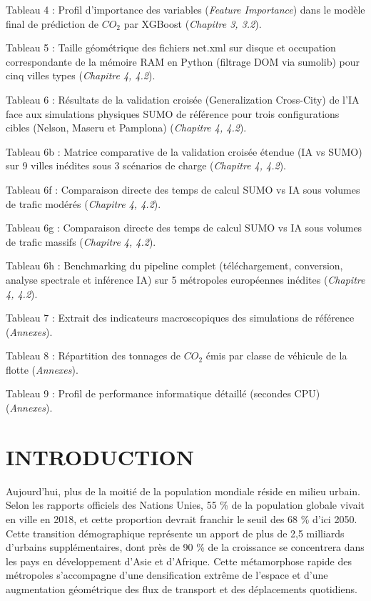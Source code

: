 \documentclass[10pt, a4paper]{article}
\begin{document}
Tableau 4 : Profil d'importance des variables (\emph{Feature
Importance}) dans le modèle final de prédiction de \(CO_2\) par XGBoost
(\emph{Chapitre 3, 3.2}).

Tableau 5 : Taille géométrique des fichiers net.xml sur disque et
occupation correspondante de la mémoire RAM en Python (filtrage DOM via
sumolib) pour cinq villes types (\emph{Chapitre 4, 4.2}).

Tableau 6 : Résultats de la validation croisée (Generalization
Cross-City) de l'IA face aux simulations physiques SUMO de référence
pour trois configurations cibles (Nelson, Maseru et Pamplona)
(\emph{Chapitre 4, 4.2}).

Tableau 6b : Matrice comparative de la validation croisée étendue (IA vs
SUMO) sur 9 villes inédites sous 3 scénarios de charge (\emph{Chapitre
4, 4.2}).

Tableau 6f : Comparaison directe des temps de calcul SUMO vs IA sous
volumes de trafic modérés (\emph{Chapitre 4, 4.2}).

Tableau 6g : Comparaison directe des temps de calcul SUMO vs IA sous
volumes de trafic massifs (\emph{Chapitre 4, 4.2}).

Tableau 6h : Benchmarking du pipeline complet (téléchargement,
conversion, analyse spectrale et inférence IA) sur 5 métropoles
européennes inédites (\emph{Chapitre 4, 4.2}).

Tableau 7 : Extrait des indicateurs macroscopiques des simulations de
référence (\emph{Annexes}).

Tableau 8 : Répartition des tonnages de \(CO_2\) émis par classe de
véhicule de la flotte (\emph{Annexes}).

Tableau 9 : Profil de performance informatique détaillé (secondes CPU)
(\emph{Annexes}).

\endgroup

\newpage

\section{INTRODUCTION}\label{introduction}

Aujourd'hui, plus de la moitié de la population mondiale réside en
milieu urbain. Selon les rapports officiels des Nations Unies, 55 \% de
la population globale vivait en ville en 2018, et cette proportion
devrait franchir le seuil des 68 \% d'ici 2050. Cette transition
démographique représente un apport de plus de 2,5 milliards d'urbains
supplémentaires, dont près de 90 \% de la croissance se concentrera dans
les pays en développement d'Asie et d'Afrique. Cette métamorphose rapide
des métropoles s'accompagne d'une densification extrême de l'espace et
d'une augmentation géométrique des flux de transport et des déplacements
quotidiens.
\end{document}
